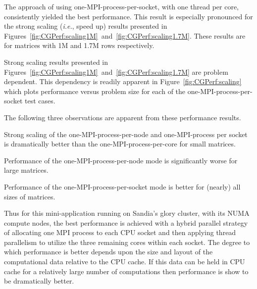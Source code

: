 \clearpage

The approach of using one-MPI-process-per-socket, with one thread per core, consistently yielded the best performance.
%
This result is especially pronounced for the strong scaling (\emph{i.e.}, speed up) results presented in Figures~\ref{fig:CGPerf:scaling1M}~and~\ref{fig:CGPerf:scaling1.7M}.
%
These results are for matrices with 1M and 1.7M rows respectively.

Strong scaling results presented in Figures~\ref{fig:CGPerf:scaling1M}~and~\ref{fig:CGPerf:scaling1.7M} are problem dependent.
%
This dependency is readily apparent in Figure~\ref{fig:CGPerf:scaling} which plots performance versus problem size for each of the one-MPI-process-per-socket test cases.


The following three observations are apparent from these performance results.
\begin{blist}
\item Strong scaling of the one-MPI-process-per-node and one-MPI-process per socket is dramatically better than the one-MPI-process-per-core for small matrices.
\item Performance of the one-MPI-process-per-node mode is significantly worse for large matrices.
\item Performance of the one-MPI-process-per-socket mode is better for (nearly) all sizes of matrices.
\end{blist}
%
Thus for this mini-application running on Sandia's glory cluster, with its NUMA compute nodes, the best performance is achieved with a hybrid parallel strategy of allocating one MPI process to each CPU socket and then applying thread parallelism to utilize the three remaining cores within each socket.
%
The degree to which performance is better depends upon the size and layout of the computational data relative to the CPU cache.
%
If this data can be held in CPU cache for a relatively large number of computations then performance is show to be dramatically better.



